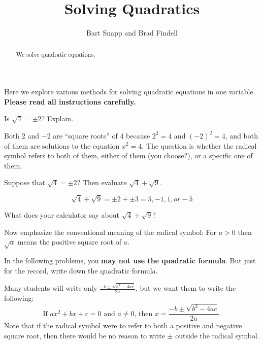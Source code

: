 \documentclass[nooutcomes]{ximera}
\title{Solving Quadratics}
\author{Bart Snapp and Brad Findell}
\begin{document}
\begin{abstract}
  We solve quadratic equations.
\end{abstract}
\maketitle

\label{A:solvingQuadratics}
Here we explore various methods for solving quadratic equations in one variable.  \textbf{Please read all instructions carefully.}

\begin{problem}
Is $\sqrt{4}=\pm 2$?  Explain. 
\end{problem}

\vfill

\begin{teachingnote}
Both $2$ and $-2$ are ``square roots'' of $4$ because $2^2=4$ and $(-2)^2=4$, and both of them are solutions to the equation $x^2=4$.  The question is whether the radical symbol refers to both of them, either of them (you choose?), or a specific one of them.  
\end{teachingnote}

\begin{problem}
Suppose that $\sqrt{4}=\pm 2$?  Then evaluate $\sqrt{4}+\sqrt{9}$.  
\end{problem}

\begin{teachingnote}
$$\sqrt{4}+\sqrt{9}=\pm2+\pm3=5, -1, 1, or -5$$
\end{teachingnote}

\vfill

\begin{problem}
What does your calculator say about $\sqrt{4}+\sqrt{9}$?  
\end{problem}

\vfill 

\begin{teachingnote}
Now emphasize the conventional meaning of the radical symbol:  For $a>0$ then $\sqrt{a}$ means the positive square root of $a$.  
\end{teachingnote}



\begin{problem}
In the following problems, you \textbf{may not use the quadratic formula}.  But just for the record, write down the quadratic formula.  
\end{problem}
\begin{teachingnote}
Many students will write only $\frac{-b\pm\sqrt{b^2-4ac}}{2a}$, but we want them to write the following:  
$$\text{If }ax^2+bx+c=0\text{ and }a\ne 0\text{, then }x=\frac{-b\pm\sqrt{b^2-4ac}}{2a}\text{.}$$
Note that if the radical symbol were to refer to both a positive and negative square root, then there would be no reason to write $\pm$ outside the radical symbol.  
\end{teachingnote}
\vspace{0.8in}
\end{document}
